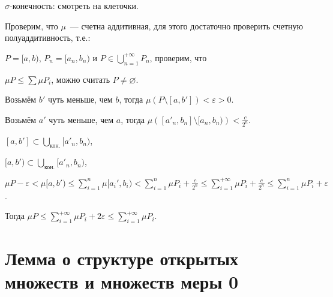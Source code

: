 \documentclass{article}
\begin{document}
            $\sigma$-конечность: смотреть на клеточки.
            
            Проверим, что $\mu$~--- счетна аддитивная, для этого достаточно проверить счетную полуаддитивность, т.е.:
            
            $P = [a, b)$, $P_n = [a_n, b_n)$ и $P \in \bigcup\limits^{+\infty}_{n = 1} P_n$, проверим, что
            
            $\mu P \leqslant \sum \mu P_i$, можно считать $P \neq \varnothing$.
            
            Возьмём $b'$ чуть меньше, чем $b$, тогда $\mu \left( P \setminus [a, b'] \right) < \varepsilon > 0$.
            
            Возьмём $a'$ чуть меньше, чем $a$, тогда $\mu \left( [a'_n, b_n] \setminus [a_n, b_n) \right) < \frac{c}{2^n}$.
            
            $[a, b'] \subset \bigcup\limits_{\text{кон.}} [a'_n, b_n)$, 
            
            $[a, b') \subset \bigcup\limits_{\text{кон.}} [a'_n, b_n)$,
            
            $\mu P - \varepsilon < \mu [a, b') \leqslant \sum\limits_{i = 1}^n \mu [a_i', b_i) < \sum\limits_{i = 1}^n \mu P_i + \frac{c}{2^n} \leqslant \sum\limits^{+\infty}_{i = 1} \mu P_i + \frac{c}{2^n} \leqslant \sum\limits^n_{i = 1} \mu P_i + \varepsilon$.
            
            Тогда $\mu P \leqslant \sum\limits^{+\infty}_{i = 1} \mu P_i + 2 \varepsilon \leqslant \sum\limits^{+\infty}_{i = 1} \mu P_i$.
            
    \newpage
    
    \section{Лемма о структуре открытых множеств и множеств меры 0}
        
\end{document}
